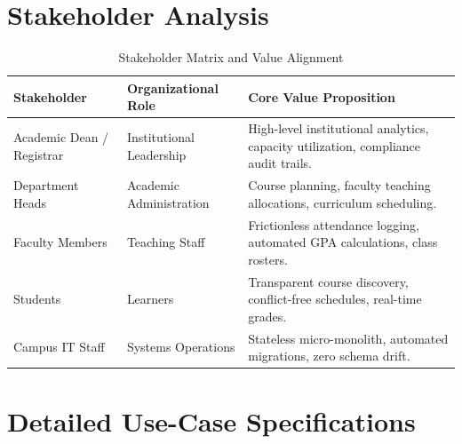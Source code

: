 \documentclass[12pt,a4paper,oneside]{report}
\begin{document}
\section{Stakeholder Analysis}
\begin{table}[h!]
\centering
\small
\begin{tabular}{p{}p{}p{}}
\toprule
\textbf{Stakeholder} & \textbf{Organizational Role} & \textbf{Core Value Proposition} \\
\midrule
Academic Dean / Registrar & Institutional Leadership & High-level institutional analytics, capacity utilization, compliance audit trails. \\
Department Heads & Academic Administration & Course planning, faculty teaching allocations, curriculum scheduling. \\
Faculty Members & Teaching Staff & Frictionless attendance logging, automated GPA calculations, class rosters. \\
Students & Learners & Transparent course discovery, conflict-free schedules, real-time grades. \\
Campus IT Staff & Systems Operations & Stateless micro-monolith, automated migrations, zero schema drift. \\
\bottomrule
\end{tabular}
\caption{Stakeholder Matrix and Value Alignment}
\end{table}

\section{Detailed Use-Case Specifications}
\end{document}
